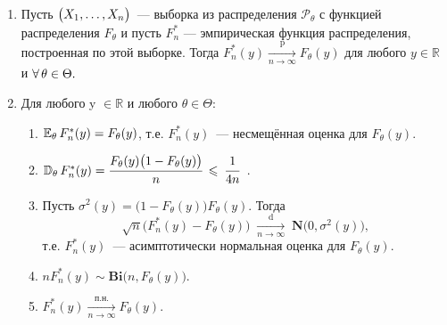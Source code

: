 \begin{namedthm}\leavevmode
    \begin{enumerate}
        \item Пусть $\bigl( X_1, \ldots, X_n \bigr)$~--- выборка из распределения $\mathcal{P}_{\theta}$ с функцией распределения $F_{\theta}$ и пусть $F_{n}^{*}$ — эмпирическая функция распределения, построенная по этой выборке. 
        Тогда $F_{n}^{*}(y) \xrightarrow[n \to \infty]{\text{p}} F_{\theta}(y)$ для любого $y \in \mathbb{R}$ и $\forall \, \theta \in \Theta.$
        \item Для любого y $\in \mathbb{R}$ и любого $\theta \in \Theta$:
        \begin{enumerate}[label={\arabic*)}]
            \item $\mathbb{E}_{\theta}\, F_{n}^{*}(y) = F_{\theta}(y)$, т.е. $F_{n}^{*}(y)$~--- несмещённая оценка для $F_{\theta}(y)$.
            \item $\mathbb{D}_{\theta}\, F_{n}^{*}(y)=\cfrac{F_{\theta}(y)\bigl(1-F_{\theta}(y)\bigr)}{n} \: \leqslant \: \cfrac{1}{4n}$\, .
            \item Пусть $\sigma^2(y) = \bigl(1 - F_{\theta}(y)\bigr)F_{\theta}(y)$. 
            Тогда
            $$\sqrt{n}\bigl( F_{n}^{*}(y)-F_{\theta}(y) \bigr) \; \xrightarrow[n \to \infty]{\text{d}} \; \mathbf{N}\bigl(0, \sigma^2(y)\bigr),$$ 
            т.е. $F_{n}^{*}(y)$~--- асимптотически нормальная оценка для $F_{\theta}(y)$.
            \item $n F_{n}^{*}(y) \sim \mathbf{Bi}\bigl(n, F_{\theta}(y)\bigr).$
            \item $F_{n}^{*}(y) \xrightarrow[n \to \infty]{\text{п.н.}} F_{\theta}(y).$
        \end{enumerate}
    \end{enumerate}
\end{namedthm}

